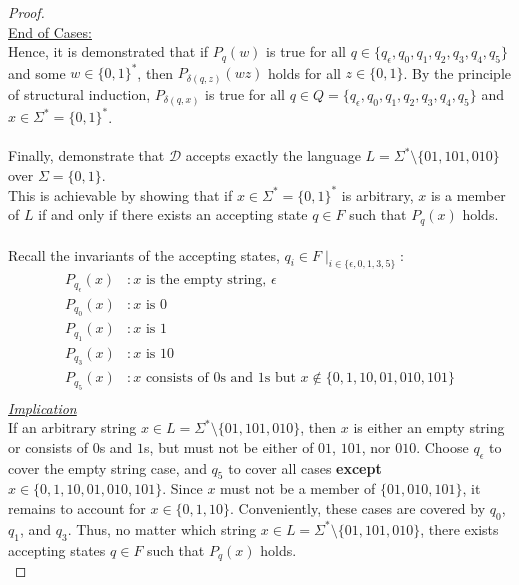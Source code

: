 \documentclass[12pt]{article}
\begin{document}
\begin{proof}
    \\
    \underline{End of Cases:} \\
    Hence, it is demonstrated that if $P_q(w)$ is true for all $q \in \{q_{\epsilon}, q_0, q_1, q_2, q_3, q_4, q_5\}$ and some $w \in \{0, 1\}^*$, then $P_{\delta(q, z)}(wz)$ holds for all $z \in \{0, 1\}$. By the principle of structural induction, $P_{\delta(q, x)}$ is true for all $q \in Q = \{q_{\epsilon}, q_0, q_1, q_2, q_3, q_4, q_5\}$ and $x \in \Sigma^* = \{0, 1\}^*$. \\
    \\
    Finally, demonstrate that $\mathcal{D}$ accepts exactly the language $L = \Sigma^* \setminus \{01, 101, 010\}$ over $\Sigma = \{0, 1\}$. \\
    This is achievable by showing that if $x \in \Sigma^* = \{0, 1\}^*$ is arbitrary, $x$ is a member of $L$ if and only if there exists an accepting state $q \in F$ such that $P_q(x)$ holds. \\
    \\
    Recall the invariants of the accepting states, $q_i \in F \mid_{i \in \{\epsilon, 0, 1, 3, 5\}}$:
    \begin{equation*}
        \begin{aligned}
            P_{q_\epsilon}(x)&: \text{$x$ is the empty string, } \epsilon \\
            P_{q_0}(x)&: \text{$x$ is $0$} \\
            P_{q_1}(x)&: \text{$x$ is $1$} \\
            P_{q_3}(x)&: \text{$x$ is $10$} \\
            P_{q_5}(x)&: \text{$x$ consists of $0$s and $1$s but $x \notin \{0, 1, 10, 01, 010, 101\}$} \\
        \end{aligned}
    \end{equation*}
    \underline{\textit{Implication}} \\
    If an arbitrary string $x \in L = \Sigma^* \setminus \{01, 101, 010\}$, then $x$ is either an empty string or consists of $0$s and $1$s, but must not be either of $01$, $101$, nor $010$. Choose $q_{\epsilon}$ to cover the empty string case, and $q_5$ to cover all cases \textbf{except} $x \in \{0, 1, 10, 01, 010, 101\}$. Since $x$ must not be a member of $\{01, 010, 101\}$, it remains to account for $x \in \{0, 1, 10\}$. Conveniently, these cases are covered by $q_0$, $q_1$, and $q_3$. Thus, no matter which string $x \in L = \Sigma^* \setminus \{01, 101, 010\}$, there exists accepting states $q \in F$ such that $P_q(x)$ holds. \\

\end{proof}
\end{document}
